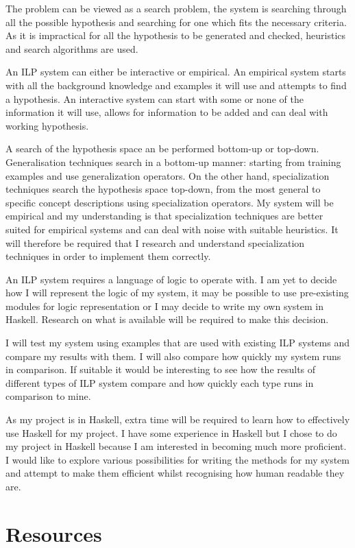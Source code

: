 \documentclass{article}
\begin{document}
The problem can be viewed as a search problem, the system is searching through
all the possible hypothesis and searching for one which fits the necessary
criteria. As it is impractical for all the hypothesis to be generated and
checked, heuristics and search algorithms are used.

An ILP system can either be interactive or empirical. An empirical system
starts with all the background knowledge and examples it will use and attempts
to find a hypothesis. An interactive system can start with some or none of the
information it will use, allows for information to be added and can deal with
working hypothesis.

A search of the hypothesis space an be performed bottom-up or top-down.
Generalisation techniques search in a bottom-up manner: starting from training
examples and use generalization operators. On the other hand, specialization
techniques search the hypothesis space top-down, from the most general to
specific concept descriptions using specialization operators. My system will
be empirical and my understanding is that specialization techniques are better
suited for empirical systems and can deal with noise with suitable heuristics.
It will therefore be required that I research and understand specialization
techniques in order to implement them correctly.

An ILP system requires a language of logic to operate with. I am yet to decide
how I will represent the logic of my system, it may be possible to use
pre-existing modules for logic representation or I may decide to write my own
system in Haskell. Research on what is available will be required to make this
decision.

I will test my system using examples that are used with existing ILP systems
and compare my results with them. I will also compare how quickly my system
runs in comparison. If suitable it would be interesting to see how the results
of different types of ILP system compare and how quickly each type runs in
comparison to mine.

As my project is in Haskell, extra time will be required to learn how to
effectively use Haskell for my project. I have some experience in Haskell but
I chose to do my project in Haskell because I am interested in becoming much
more proficient. I would like to explore various possibilities for writing the
methods for my system and attempt to make them efficient whilst recognising
how human readable they are.

\section*{Resources}
\end{document}
